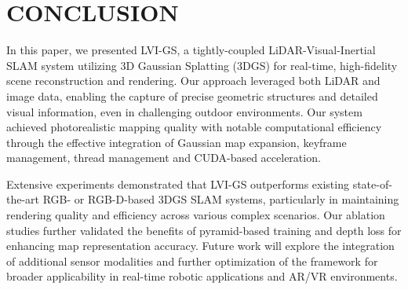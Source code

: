 \documentclass[lettersize,journal]{IEEEtran}
\begin{document}
\section{CONCLUSION}

In this paper, we presented LVI-GS, a tightly-coupled LiDAR-Visual-Inertial SLAM system utilizing 3D Gaussian Splatting (3DGS) for real-time, high-fidelity scene reconstruction and rendering. Our approach leveraged both LiDAR and image data, enabling the capture of precise geometric structures and detailed visual information, even in challenging outdoor environments. Our system achieved photorealistic mapping quality with notable computational efficiency through the effective integration of Gaussian map expansion, keyframe management, thread management and CUDA-based acceleration.

Extensive experiments demonstrated that LVI-GS outperforms existing state-of-the-art RGB- or RGB-D-based 3DGS SLAM systems, particularly in maintaining rendering quality and efficiency across various complex scenarios. Our ablation studies further validated the benefits of pyramid-based training and depth loss for enhancing map representation accuracy. Future work will explore the integration of additional sensor modalities and further optimization of the framework for broader applicability in real-time robotic applications and AR/VR environments.





\end{document}
